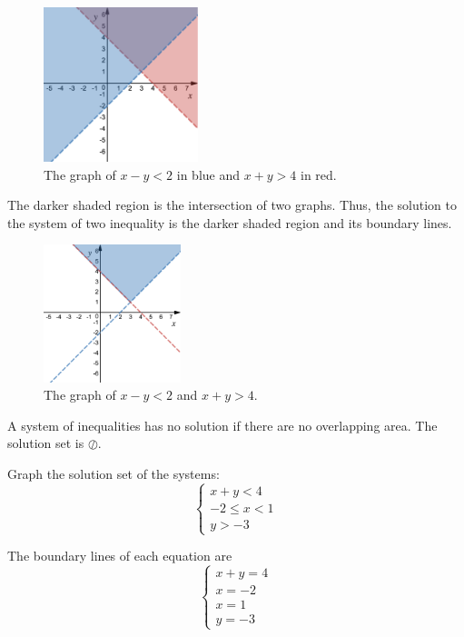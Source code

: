 %
\begin{figure}[H]
 \includegraphics[width=4.5cm]{pics/pic4.png}
 \centering
  \caption{The graph of $x-y<2$ in blue and $x+y>4$ in red.}
\end{figure}
% 
The darker shaded region is the intersection of two graphs. Thus, the solution to the system of two inequality is the darker shaded region and its boundary lines.
% 
\begin{figure}[H]
 \includegraphics[width=4cm]{pics/pic5.png}
 \centering
  \caption{The graph of $x-y<2$ and $x+y>4$.}
\end{figure}
\begin{note}
	A system of inequalities has no solution if there are no overlapping area. The solution set is $\oslash$.
\end{note}
\begin{example}
	Graph the solution set of the systems:
	\begin{equation*}
		\begin{cases}
			x+y <4 \\
			-2\leq x<1 \\
			y > -3
		\end{cases}
	\end{equation*}
\end{example}
%
The boundary lines of each equation are
	\begin{equation*}
		\begin{cases}
			x+y = 4 \\
			x = -2 \\
			x = 1 \\
			y = -3
		\end{cases}
	\end{equation*}
